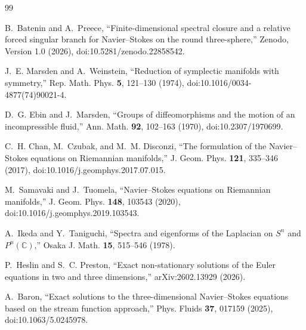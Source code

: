 \documentclass[
 aps,
 prd,
 reprint,
 amsmath,
 amssymb,
 nofootinbib,
 superscriptaddress
]{revtex4-2}
\theoremstyle{definition}
\theoremstyle{remark}
\begin{document}
\begin{thebibliography}{99}

B.~Batenin and A.~Preece,
``Finite-dimensional spectral closure and a relative forced singular branch
for Navier--Stokes on the round three-sphere,''
Zenodo, Version 1.0 (2026), doi:10.5281/zenodo.22858542.

J.~E. Marsden and A.~Weinstein,
``Reduction of symplectic manifolds with symmetry,''
Rep. Math. Phys. \textbf{5}, 121--130 (1974),
doi:10.1016/0034-4877(74)90021-4.

D.~G. Ebin and J.~Marsden,
``Groups of diffeomorphisms and the motion of an incompressible fluid,''
Ann. Math. \textbf{92}, 102--163 (1970),
doi:10.2307/1970699.

C.~H. Chan, M.~Czubak, and M.~M. Disconzi,
``The formulation of the Navier--Stokes equations on Riemannian manifolds,''
J. Geom. Phys. \textbf{121}, 335--346 (2017),
doi:10.1016/j.geomphys.2017.07.015.


M.~Samavaki and J.~Tuomela,
``Navier--Stokes equations on Riemannian manifolds,''
J. Geom. Phys. \textbf{148}, 103543 (2020),
doi:10.1016/j.geomphys.2019.103543.

A.~Ikeda and Y.~Taniguchi,
``Spectra and eigenforms of the Laplacian on $S^n$ and $P^n(\mathbb C)$,''
Osaka J. Math. \textbf{15}, 515--546 (1978).

P.~Heslin and S.~C. Preston,
``Exact non-stationary solutions of the Euler equations in two and three
dimensions,''
arXiv:2602.13929 (2026).

A.~Baron,
``Exact solutions to the three-dimensional Navier--Stokes equations based on
the stream function approach,''
Phys. Fluids \textbf{37}, 017159 (2025),
doi:10.1063/5.0245978.

\end{thebibliography}



\end{document}
